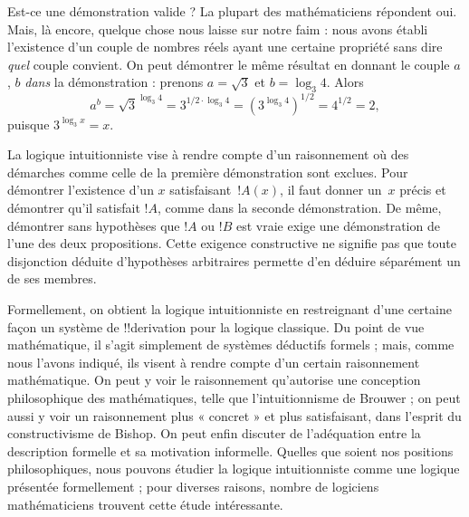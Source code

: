 \documentclass[../../../include/open-logic-section]{subfiles}
\begin{document}
Est-ce une démonstration valide ? La plupart des mathématiciens
répondent oui. Mais, là encore, quelque chose nous laisse sur notre
faim : nous avons établi l'existence d'un couple de nombres réels
ayant une certaine propriété sans dire \emph{quel} couple convient.
On peut démontrer le même résultat en donnant le couple $a$, $b$
\emph{dans} la démonstration : prenons $a = \sqrt{3}$ et
$b = \log_3 4$. Alors
\[
a^b = \sqrt{3}^{\log_3 4} = 3^{1/2 \cdot \log_3 4} = (3^{\log_3
  4})^{1/2} = 4^{1/2}= 2,
\]
puisque $3^{\log_3 x} = x$.
%
%
%
%

La logique intuitionniste vise à rendre compte d'un raisonnement où
des démarches comme celle de la première démonstration sont exclues.
Pour démontrer l'existence d'un $x$ satisfaisant~$!A(x)$, il faut donner
un~$x$ précis et démontrer qu'il satisfait $!A$, comme dans la seconde
démonstration. De même, démontrer sans hypothèses que $!A$ ou $!B$
est vraie exige une démonstration de l'une des deux propositions.
Cette exigence constructive ne signifie pas que toute disjonction
déduite d'hypothèses arbitraires permette d'en déduire séparément
un de ses membres.

Formellement, on obtient la logique intuitionniste en restreignant
d'une certaine façon un système de !!{derivation} pour la logique
classique. Du point de vue mathématique, il s'agit simplement de
systèmes déductifs formels ; mais, comme nous l'avons indiqué,
ils visent à rendre compte d'un certain raisonnement mathématique.
On peut y voir le raisonnement qu'autorise une conception philosophique
des mathématiques, telle que l'intuitionnisme de Brouwer ; on peut
aussi y voir un raisonnement plus « concret » et plus satisfaisant,
dans l'esprit du constructivisme de Bishop. On peut enfin discuter
de l'adéquation entre la description formelle et sa motivation informelle.
Quelles que soient nos positions philosophiques, nous pouvons étudier
la logique intuitionniste comme une logique présentée formellement ;
pour diverses raisons, nombre de logiciens mathématiciens trouvent
cette étude intéressante.
\end{document}

